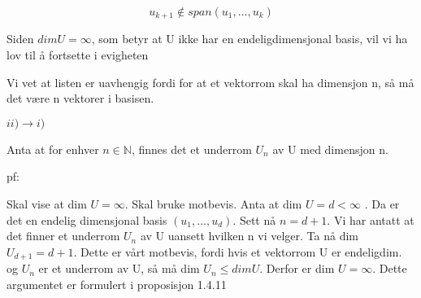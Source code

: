 \documentclass[11pt]{article}
\begin{document}
\[
     u_{k+1} \notin span(u_1, ..., u_k)
\] 

Siden $ dim U = \infty $, som betyr at U ikke har en endeligdimensjonal basis, vil vi ha lov til å fortsette i evigheten 

Vi vet at listen er uavhengig fordi for at et vektorrom skal ha dimensjon n, så må det være n vektorer i basisen. 


$ ii) \rightarrow i)$

Anta at for enhver $ n \in \mathbb{N} $, finnes det et underrom $ U_n $ av U med dimensjon n.


pf:

Skal vise at dim $ U=\infty $. Skal bruke motbevis. Anta at dim $ U=d < \infty $ . Da er det en endelig dimensjonal basis  $ (u_1, ..., u_d) $. Sett nå $ n=d+1 $. Vi har antatt at det finner et underrom $ U_n $ av U uansett hvilken n vi velger. Ta nå dim $ U_{d+1} = d+1 $. Dette er vårt motbevis, fordi hvis et vektorrom U er endeligdim. og $ U_n $ er et underrom av U, så må dim $ U_n \leq dim U $. Derfor er dim $ U = \infty $. Dette argumentet er formulert i proposisjon 1.4.11
\end{document}
